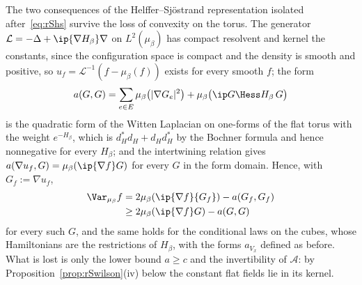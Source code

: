 The two consequences of the Helffer--Sj\"ostrand representation isolated
after~\eqref{eq:rShs} survive the loss of convexity on the torus. The
generator $\mathcal L=-\Delta+\ip{\nabla H_\beta}\nabla$ on $L^2(\mu_\beta)$
has compact resolvent and kernel the constants, since the configuration
space is compact and the density is smooth and positive, so $u_f=\mathcal
L^{-1}(f-\mu_\beta(f))$ exists for every smooth $f$; the form
\[
a(G,G)=\sum_{e\in E}\mu_\beta\bigl(\lvert\nabla G_e\rvert^2\bigr)+\mu_\beta
\bigl(\ip G{\Hess H_\beta\,G}\bigr)
\]
is the quadratic form of the Witten Laplacian on one-forms of the flat torus
with the weight $e^{-H_\beta}$, which is $d_H^*d_H+d_Hd_H^*$ by the Bochner
formula and hence nonnegative for every $H_\beta$; and the intertwining
relation gives $a(\nabla u_f,G)=\mu_\beta(\ip{\nabla f}G)$ for every $G$ in
the form domain. Hence, with $G_f:=\nabla u_f$,
\begin{align}\label{eq:rShstorus}
\Var_{\mu_\beta}f&=2\mu_\beta(\ip{\nabla f}{G_f})-a(G_f,G_f)\notag\\
&\ge2\mu_\beta(\ip{\nabla f}G)-a(G,G)
\end{align}
for every such $G$, and the same holds for the conditional laws on the cubes,
whose Hamiltonians are the restrictions of $H_\beta$, with the forms $a_{V_x}$
defined as before. What is lost is only the lower bound $a\ge c$ and the
invertibility of $\mathcal A$: by Proposition~\ref{prop:rSwilson}(iv) below
the constant flat fields lie in its kernel.

